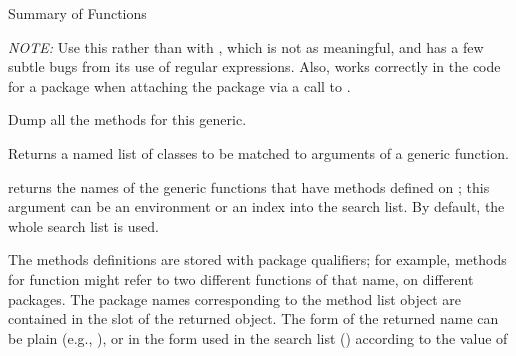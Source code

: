 \begin{Section}{Summary of Functions}
\begin{description}
\emph{NOTE:} Use this rather than  with
, which is not as meaningful, and has a few
subtle bugs from its use of regular expressions.  Also,
 works correctly in the code for a package
when attaching the package via a call to .

\item[\code{dumpMethods}:] 
Dump all the methods for this generic.

\item[\code{signature}:] 
Returns a named list of classes to be matched to arguments of a
generic function.

\item[\code{getGenerics}:] returns the names of the generic
functions that have methods defined on ; this
argument can be an environment or an index into the search
list.  By default, the whole search list is used.

The methods definitions are stored with
package qualifiers; for example, methods for function
 might refer to two different functions
of that name, on different packages.  The package names
corresponding to the method list object are contained in the
slot  of the returned object.  The form of
the returned name can be plain (e.g., ), or in
the form used in the search list ()
according to the value of 


\end{description}

\end{Section}
%
